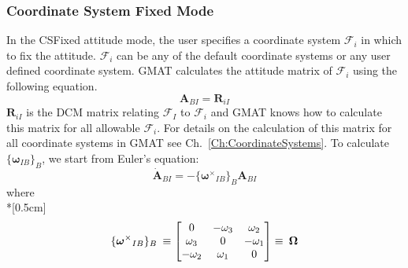 \subsubsection{Coordinate System Fixed Mode}

In the CSFixed attitude mode, the user specifies a coordinate system $\mathcal{F}_i$ in which to fix the attitude.
$\mathcal{F}_i$ can be any of the default coordinate systems or any user defined
coordinate system. GMAT calculates the attitude matrix of $\mathcal{F}_i$ using the
following equation.
%
\begin{equation}
    \mathbf{A}_{BI} = \mathbf{R}_{iI}
    \label{Eq:CSFixedRotationMatrix}
\end{equation}
%
$\mathbf{R}_{iI}$ is the DCM matrix relating $\mathcal{F}_I$ to $\mathcal{F}_i$
and GMAT knows how to calculate this matrix for all allowable $\mathcal{F}_i$.
For details on the calculation of this matrix for all coordinate systems in GMAT
see Ch.~\ref{Ch:CoordinateSystems}. To calculate $\{\mathbf{\boldsymbol\omega}_{IB}\}_B$, we start from Euler's
equation:
%
\begin{equation}
    \dot{\mathbf{A}}_{BI} = -\{\mathbf{\boldsymbol\omega^\times}_{IB}\}_B\mathbf{A}_{BI}
    \label{Eq:CSFixedKinematics}
\end{equation}
%
where\\*[0.5cm]
%
\begin{equation}
    \{ \mathbf{\boldsymbol\omega^\times}_{IB}\}_B\hspace{0.082cm}\equiv
        \begin{bmatrix}
                 0      & -\omega_{3} &  \omega_{2} \\
             \omega_{3} &      0      & -\omega_{1} \\
            -\omega_{2} &  \omega_{1} &      0
        \end{bmatrix}
    \equiv \hspace{0.082cm}\boldsymbol \Omega
    \label{Eq:OmegaCrossMatrix}
\end{equation}
